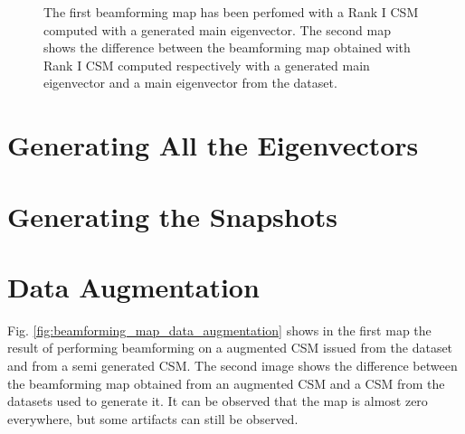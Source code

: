 \documentclass[11pt,a4paper,twoside]{report}
\begin{document}
\begin{figure}
    \centering
    \caption{The first beamforming map has been perfomed with a Rank I CSM computed with a generated main eigenvector. The second map shows the difference between the beamforming map obtained with Rank I CSM computed respectively with a generated main eigenvector and a main eigenvector from the dataset.}
    \label{fig:beamforming_map_main_evec_wgangp}    
\end{figure}

\section{Generating All the Eigenvectors}

\section{Generating the Snapshots}

\section{Data Augmentation}

Fig. \ref{fig:beamforming_map_data_augmentation} shows in the first map the result of performing beamforming on a augmented CSM issued from the dataset and from a semi generated CSM. The second image shows the difference between the beamforming map obtained from an augmented CSM and a CSM from the datasets used to generate it. It can be observed that the map is almost zero everywhere, but some artifacts can still be observed.
\end{document}
